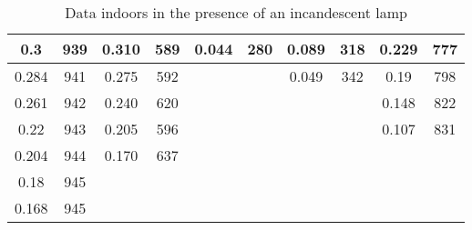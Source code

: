 \begin{table}[H]
{\begin{tabular}{|cc|cc|cc|cc|cc|}
		\multicolumn{1}{|c|}{0.3}            & 939                                & \multicolumn{1}{c|}{0.310}          & 589                               & \multicolumn{1}{c|}{0.044}           & 280                   & \multicolumn{1}{c|}{0.089}      & 318                   & \multicolumn{1}{c|}{0.229}      & 777                   \\ \hline
		\multicolumn{1}{|c|}{0.284}          & 941                                & \multicolumn{1}{c|}{0.275}          & 592                               & \multicolumn{1}{c|}{}                &                       & \multicolumn{1}{c|}{0.049}      & 342                   & \multicolumn{1}{c|}{0.19}       & 798                   \\ \hline
		\multicolumn{1}{|c|}{0.261}          & 942                                & \multicolumn{1}{c|}{0.240}          & 620                               & \multicolumn{1}{c|}{}                &                       & \multicolumn{1}{c|}{}           &                       & \multicolumn{1}{c|}{0.148}      & 822                   \\ \hline
		\multicolumn{1}{|c|}{0.22}           & 943                                & \multicolumn{1}{c|}{0.205}          & 596                               & \multicolumn{1}{c|}{}                &                       & \multicolumn{1}{c|}{}           &                       & \multicolumn{1}{c|}{0.107}      & 831                   \\ \hline
		\multicolumn{1}{|c|}{0.204}          & 944                                & \multicolumn{1}{c|}{0.170}          & 637                               & \multicolumn{1}{c|}{}                &                       & \multicolumn{1}{c|}{}           &                       & \multicolumn{1}{c|}{}           &                       \\ \hline
		\multicolumn{1}{|c|}{0.18}           & 945                                & \multicolumn{1}{c|}{}               &                                   & \multicolumn{1}{c|}{}                &                       & \multicolumn{1}{c|}{}           &                       & \multicolumn{1}{c|}{}           &                       \\ \hline
		\multicolumn{1}{|c|}{0.168}          & 945                                & \multicolumn{1}{c|}{}               &                                   & \multicolumn{1}{c|}{}                &                       & \multicolumn{1}{c|}{}           &                       & \multicolumn{1}{c|}{}           &                       \\ \hline
	\end{tabular}%
	}
	\caption{Data indoors in the presence of an incandescent lamp}
	\label{tab:indoor}
\end{table}